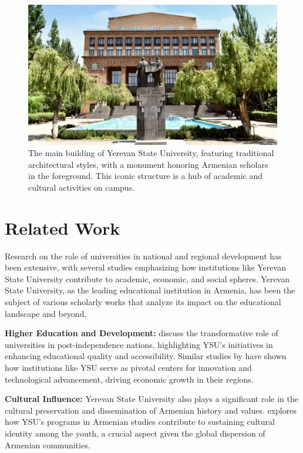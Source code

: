\documentclass[12pt,onecolumn]{article}
\begin{document}
\begin{figure}[h]
    \centering
    \includegraphics[width=\linewidth]{figures/ysu.jpeg}
    \caption{The main building of Yerevan State University, featuring traditional architectural styles, with a monument honoring Armenian scholars in the foreground. This iconic structure is a hub of academic and cultural activities on campus.
    }
    \label{fig:teaser-image}
\end{figure}


\clearpage
\section{Related Work}

Research on the role of universities in national and regional development has been extensive, with several studies emphasizing how institutions like Yerevan State University contribute to academic, economic, and social spheres. Yerevan State University, as the leading educational institution in Armenia, has been the subject of various scholarly works that analyze its impact on the educational landscape and beyond.

\textbf{Higher Education and Development:} \cite{smith2018transformation} discuss the transformative role of universities in post-independence nations, highlighting YSU's initiatives in enhancing educational quality and accessibility. Similar studies by \cite{oconnor2020innovation} have shown how institutions like YSU serve as pivotal centers for innovation and technological advancement, driving economic growth in their regions.

\textbf{Cultural Influence:} Yerevan State University also plays a significant role in the cultural preservation and dissemination of Armenian history and values. \cite{karapetyan2019cultural} explores how YSU's programs in Armenian studies contribute to sustaining cultural identity among the youth, a crucial aspect given the global dispersion of Armenian communities.
\end{document}
